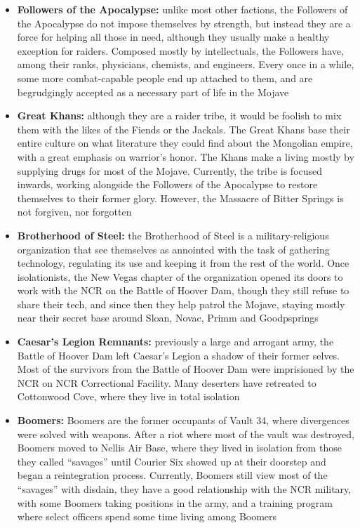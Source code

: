 \documentclass[11pt]{article} %
\begin{document}
\begin{itemize}
	\item \textbf{Followers of the Apocalypse:} unlike most other factions, the Followers of the Apocalypse do not impose themselves by strength, but instead they are a force for helping all those in need, although they usually make a healthy exception for raiders. Composed mostly by intellectuals, the Followers have, among their ranks, physicians, chemists, and engineers. Every once in a while, some more combat-capable people end up attached to them, and are begrudgingly accepted as a necessary part of life in the Mojave
	
	\item \textbf{Great Khans:} although they are a raider tribe, it would be foolish to mix them with the likes of the Fiends or the Jackals. The Great Khans base their entire culture on what literature they could find about the Mongolian empire, with a great emphasis on warrior's honor. The Khans make a living mostly by supplying drugs for most of the Mojave. Currently, the tribe is focused inwards, working alongside the Followers of the Apocalypse to restore themselves to their former glory. However, the Massacre of Bitter Springs is not forgiven, nor forgotten
	
	\item \textbf{Brotherhood of Steel:} the Brotherhood of Steel is a military-religious organization that see themselves as annointed with the task of gathering technology, regulating its use and keeping it from the rest of the world. Once isolationists, the New Vegas chapter of the organization opened its doors to work with the NCR on the Battle of Hoover Dam, though they still refuse to share their tech, and since then they help patrol the Mojave, staying mostly near their secret base around Sloan, Novac, Primm and Goodpsprings 
	
	\item \textbf{Caesar's Legion Remnants:} previously a large and arrogant army, the Battle of Hoover Dam left Caesar's Legion a shadow of their former selves. Most of the survivors from the Battle of Hoover Dam were imprisioned by the NCR on NCR Correctional Facility. Many deserters have retreated to Cottonwood Cove, where they live in total isolation
	
	\item \textbf{Boomers:} Boomers are the former occupants of Vault 34, where divergences were solved with weapons. After a riot where most of the vault was destroyed, Boomers moved to Nellis Air Base, where they lived in isolation from those they called ``savages'' until Courier Six showed up at their doorstep and began a reintegration process. Currently, Boomers still view most of the ``savages'' with disdain, they have a good relationship with the NCR military, with some Boomers taking positions in the army, and a training program where select officers spend some time living among Boomers
	

\end{itemize}
\end{document}
